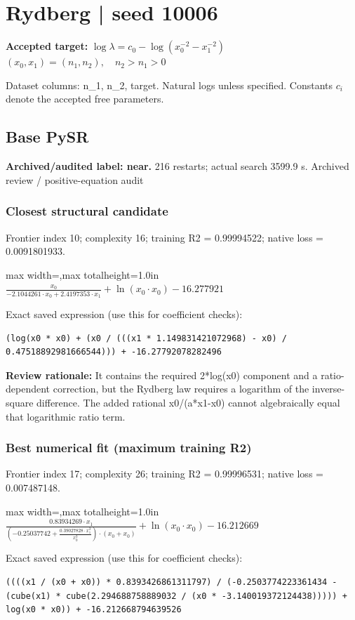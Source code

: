 \documentclass[10pt,letterpaper,landscape]{article}
\begin{document}
\section*{Rydberg | seed 10006}
\textbf{Accepted target:} $\displaystyle \log\lambda=c_0-\log\!\left(x_0^{-2}-x_1^{-2}\right)$\hfill $(x_0,x_1)=(n_1,n_2),\quad n_2>n_1>0$\par
{\small Dataset columns: n\_1, n\_2, target. Natural logs unless specified. Constants $c_i$ denote the accepted free parameters.}\par\medskip
\begin{minipage}[t]{0.485\textwidth}
\subsection*{Base PySR}
\textbf{Archived/audited label: near.} 216 restarts; actual search 3599.9 s.
{\small Archived review / positive-equation audit}
\subsubsection*{Closest structural candidate}
Frontier index 10; complexity 16; training R2 = 0.99994522; native loss = 0.0091801933.
\begin{center}\begin{adjustbox}{max width=\linewidth,max totalheight=1.0in}$\displaystyle \frac{x_{0}}{- 2.1044261 \cdot x_{0} + 2.4197353 \cdot x_{1}} + \ln{\left(x_{0} \cdot x_{0} \right)} - 16.277921$\end{adjustbox}\end{center}
{\scriptsize Exact saved expression (use this for coefficient checks):}
\begin{lstlisting}
(log(x0 * x0) + (x0 / (((x1 * 1.149831421072968) - x0) / 0.47518892981666544))) + -16.27792078282496
\end{lstlisting}
{\small\textbf{Review rationale:} It contains the required 2*log(x0) component and a ratio-dependent correction, but the Rydberg law requires a logarithm of the inverse-square difference. The added rational x0/(a*x1-x0) cannot algebraically equal that logarithmic ratio term.}
\subsubsection*{Best numerical fit (maximum training R2)}
Frontier index 17; complexity 26; training R2 = 0.99996531; native loss = 0.007487148.
\begin{center}\begin{adjustbox}{max width=\linewidth,max totalheight=1.0in}$\displaystyle \frac{0.83934269 \cdot x_{1}}{\left(-0.25037742 + \frac{0.39027828 \cdot x_{1}^{3}}{x_{0}^{3}}\right) \cdot \left(x_{0} + x_{0}\right)} + \ln{\left(x_{0} \cdot x_{0} \right)} - 16.212669$\end{adjustbox}\end{center}
{\scriptsize Exact saved expression (use this for coefficient checks):}
\begin{lstlisting}
((((x1 / (x0 + x0)) * 0.8393426861311797) / (-0.2503774223361434 - (cube(x1) * cube(2.294688758889032 / (x0 * -3.140019372124438))))) + log(x0 * x0)) + -16.212668794639526
\end{lstlisting}
\end{minipage}\hfill
\end{document}
